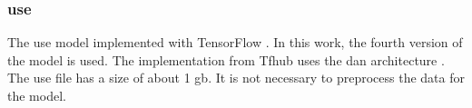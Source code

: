 \subsubsection*{\ac{use}}\label{subsubsec:impl-use}

The \ac{use} model implemented with TensorFlow \cite{HfsentTrans2019}.
In this work, the fourth version of the model is used.
The implementation from Tfhub uses the \ac{dan} architecture \cite{UniversalSentEnc-dev}.
The \ac{use} file has a size of about 1 \ac{gb}. %
It is not necessary to preprocess the data for the model.